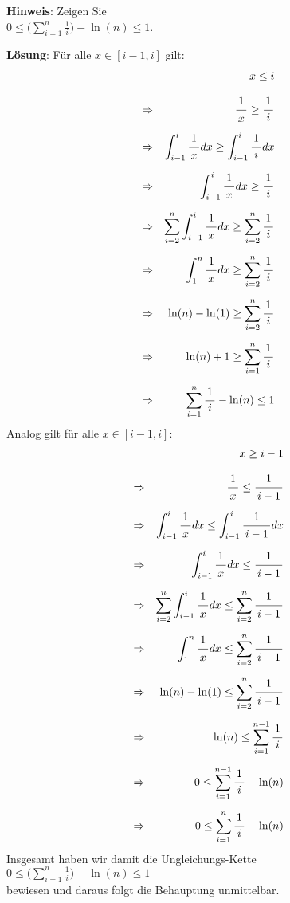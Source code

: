 \documentclass{article}
\newcommand{\bruch}[2]{\frac{\displaystyle \raisebox{1pt}[0pt][-0pt]{$\,#1\,$}}{\displaystyle \raisebox{0pt}[9pt]{$\,#2\,$}}}
\newcommand{\solution}{\vspace*{0.2cm}

\noindent
\textbf{L\"osung}: }
\begin{document}
\noindent
\textbf{Hinweis}:  Zeigen Sie 
\\[0.2cm]
\hspace*{1.3cm}
$0 \leq \biggl(\sum\limits_{i=1}^n \frac{1}{i}\biggr) - \ln(n) \leq 1$.

\solution
F\"ur alle $x \in [i-1,i]$ gilt:
\begin{eqnarray*}
&             & x \leq i \\[0.3cm]
& \Rightarrow & \bruch{1}{x} \geq \bruch{1}{i} \\[0.2cm]
& \Rightarrow & \int_{i-1}^i \bruch{1}{x} dx \geq \int_{i-1}^i \bruch{1}{i} dx \\[0.2cm]
& \Rightarrow & \int_{i-1}^i \bruch{1}{x} dx \geq \bruch{1}{i} \\[0.2cm]
& \Rightarrow & \sum\limits_{i=2}^{n} \int_{i-1}^i \bruch{1}{x} dx \geq 
                \sum\limits_{i=2}^{n} \bruch{1}{i}                      \\[0.2cm]
& \Rightarrow & \int_{1}^n \bruch{1}{x} dx \geq \sum\limits_{i=2}^{n} \bruch{1}{i} \\[0.2cm]
& \Rightarrow & \ln(n) - \ln(1) \geq \sum\limits_{i=2}^{n} \bruch{1}{i} \\[0.2cm]
& \Rightarrow & \ln(n) + 1 \geq \sum\limits_{i=1}^{n} \bruch{1}{i} \\[0.2cm]
& \Rightarrow & \sum\limits_{i=1}^{n} \bruch{1}{i} - \ln(n) \leq 1 
\end{eqnarray*}
Analog gilt f\"ur alle $x \in [i-1,i]$:
\begin{eqnarray*}
&             & x \geq i - 1 \\[0.3cm]
& \Rightarrow & \bruch{1}{x} \leq \bruch{1}{i-1} \\[0.2cm]
& \Rightarrow & \int_{i-1}^i \bruch{1}{x} dx \leq \int_{i-1}^i \bruch{1}{i-1} dx \\[0.2cm]
& \Rightarrow & \int_{i-1}^i \bruch{1}{x} dx \leq \bruch{1}{i-1} \\[0.2cm]
& \Rightarrow & \sum\limits_{i=2}^{n} \int_{i-1}^i \bruch{1}{x} dx \leq 
                \sum\limits_{i=2}^{n} \bruch{1}{i-1}                      \\[0.2cm]
& \Rightarrow & \int_{1}^n \bruch{1}{x} dx \leq \sum\limits_{i=2}^{n} \bruch{1}{i-1} \\[0.2cm]
& \Rightarrow & \ln(n) - \ln(1) \leq \sum\limits_{i=2}^{n} \bruch{1}{i-1} \\[0.2cm]
& \Rightarrow & \ln(n) \leq \sum\limits_{i=1}^{n-1} \bruch{1}{i} \\[0.2cm]
& \Rightarrow & 0 \leq \sum\limits_{i=1}^{n-1} \bruch{1}{i} - \ln(n) \\[0.2cm]
& \Rightarrow & 0 \leq \sum\limits_{i=1}^{n} \bruch{1}{i} - \ln(n) 
\end{eqnarray*}
Insgesamt haben wir damit die Ungleichungs-Kette
\\[0.2cm]
\hspace*{1.3cm}
$0 \leq \biggl(\sum\limits_{i=1}^n \frac{1}{i}\biggr) - \ln(n) \leq 1$
\\[0.2cm]
bewiesen und daraus folgt die Behauptung unmittelbar.
\end{document}
